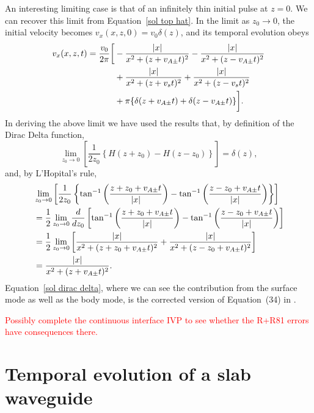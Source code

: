 \documentclass[12pt]{../style-files/ociamthesis}
\begin{document}
An interesting limiting case is that of an infinitely thin initial pulse at $z = 0$. We can recover this limit from Equation~\eqref{sol top hat}. In the limit as $z_0 \to 0$, the initial velocity becomes $v_x(x, z, 0) = v_0 \delta(z)$, and its temporal evolution obeys
\begin{align}
v_x(x, z, t) = \frac{v_0}{2\pi} \bigg[ &- \frac{|x|}{x^2 + (z + v_{A\pm}t)^2} - \frac{|x|}{x^2 + (z - v_{A\pm}t)^2} \notag \\
&+ \frac{|x|}{x^2 + (z + v_st)^2} + \frac{|x|}{x^2 + (z - v_st)^2} \notag \\
&+ \pi\{\delta(z + v_{A\pm}t) + \delta(z - v_{A\pm}t)\} \bigg]. \label{sol dirac delta}
\end{align}
In deriving the above limit we have used the results that, by definition of the Dirac Delta function,
\begin{equation}
\lim_{z_0 \to 0} \left[\frac{1}{2z_0} \left\{H(z + z_0) - H(z - z_0)\right\}\right] = \delta(z),
\end{equation}
and, by L'Hopital's rule,
\begin{align}
&\lim_{z_0 \to 0} \left[\frac{1}{2z_0}\left\{\tan^{-1}\left( \frac{z + z_0 + v_{A\pm}t}{|x|} \right) - \tan^{-1}\left( \frac{z - z_0 + v_{A\pm}t}{|x|} \right)\right\}\right] \notag \\
&= \frac{1}{2} \lim_{z_0 \to 0} \frac{d}{dz_0} \left[\tan^{-1}\left( \frac{z + z_0 + v_{A\pm}t}{|x|} \right) - \tan^{-1}\left( \frac{z - z_0 + v_{A\pm}t}{|x|} \right)\right] \notag \\
&= \frac{1}{2} \lim_{z_0 \to 0} \left[ \frac{|x|}{x^2 + (z + z_0 + v_{A\pm}t)^2} + \frac{|x|}{x^2 + (z - z_0 + v_{A\pm}t)^2} \right] \notag \\
&= \frac{|x|}{x^2 + (z + v_{A\pm}t)^2}.
\end{align}
Equation~\eqref{sol dirac delta}, where we can see the contribution from the surface mode as well as the body mode, is the corrected version of Equation~(34) in \cite{rae_etal81}.

\textcolor{red}{Possibly complete the continuous interface IVP to see whether the R+R81 errors have consequences there.}

\section{Temporal evolution of a slab waveguide}
\label{sec: IVP slab}
\end{document}
